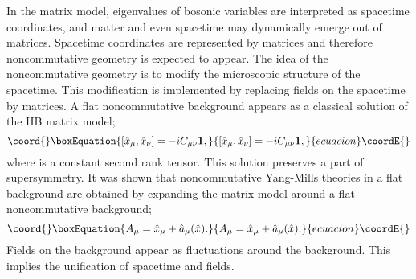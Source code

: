 \documentclass[a4paper,11pt]{article}
\begin{document}
In the matrix model, eigenvalues of 
bosonic variables are interpreted as spacetime 
coordinates, and matter and even spacetime may 
dynamically emerge out of matrices\cite{AIKKTT,AIKKT}. 
Spacetime coordinates are represented  
by matrices and therefore noncommutative geometry 
is expected to appear. 
The idea of the noncommutative geometry 
is to modify the microscopic structure of the spacetime. 
This modification is implemented by replacing fields 
on the spacetime by matrices. 
A flat noncommutative background appears 
as a classical solution of the IIB matrix model; 
\begin{equation}\coord{}\boxEquation{ 
[\hat{x}_{\mu},\hat{x}_{\nu}]=-iC_{\mu\nu}{\bf 1}, 
\label{heisenberg} 
}{ 
[\hat{x}_{\mu},\hat{x}_{\nu}]=-iC_{\mu\nu}{\bf 1}, 
}{ecuacion}\coordE{}\end{equation} 
where \coordHE{} is a constant second rank tensor. 
This solution preserves a part of supersymmetry. 
It was shown\cite{Li,AIIKKT} that 
noncommutative Yang-Mills theories in a flat background  
are obtained by 
expanding the matrix model around 
a flat noncommutative background; 
\begin{equation}\coord{}\boxEquation{
A_{\mu}=\hat{x}_{\mu}+\hat{a}_{\mu}(\hat{x}). 
\label{expansion}
}{
A_{\mu}=\hat{x}_{\mu}+\hat{a}_{\mu}(\hat{x}). 
}{ecuacion}\coordE{}\end{equation}
Fields on the background appear as 
fluctuations around the background. 
This implies  
the unification of spacetime and fields. 
\end{document}
